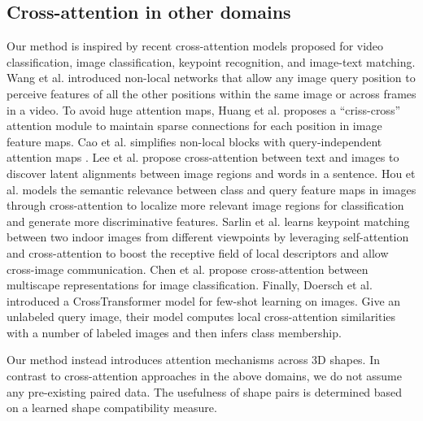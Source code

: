 \documentclass{egpubl}
\begin{document}
\subsection{Cross-attention in other domains} Our method is inspired by recent cross-attention models proposed for video classification, image classification, keypoint recognition, and image-text matching. Wang et al. \cite{wang2018non} introduced non-local networks that allow  any image query position to perceive features of all the other positions within the same image or across frames in a video. To avoid huge attention maps, Huang et al. proposes a ``criss-cross'' attention module \cite{huang2018ccnet} to maintain sparse connections for each position in image feature maps.
Cao et al. \cite{cao2019GCNet} 
 simplifies non-local blocks
with  query-independent attention maps \cite{cao2019GCNet}.
Lee et al. \cite{lee2018stacked} propose cross-attention between text and images to discover latent alignments between image regions and words in a sentence.
Hou et al. \cite{hou2019cross} models the semantic relevance between class and query feature maps in images through cross-attention to localize more relevant image regions for classification and generate more discriminative features.  Sarlin et al. \cite{sarlin2019superglue} learns keypoint matching between two indoor images from different viewpoints by leveraging self-attention and cross-attention to boost  the receptive field of local descriptors and allow cross-image communication. Chen et al. \cite{Chen_2021_ICCV} propose cross-attention between multiscape representations for image classification. Finally, Doersch et al. \cite{doersch2020crosstransformers} introduced a CrossTransformer model for few-shot learning on images. Give an unlabeled query image, their model computes local cross-attention similarities with a number of labeled images and then infers class membership.

Our method instead introduces attention mechanisms across 3D shapes. In contrast to cross-attention approaches in 
the above domains, we do not assume any pre-existing paired data. The usefulness of shape pairs is determined based
on a learned shape compatibility measure.
\end{document}
